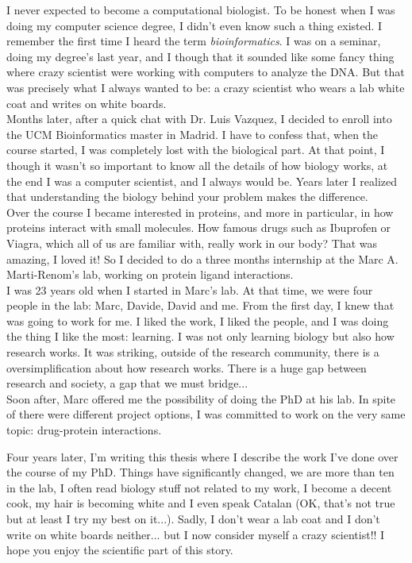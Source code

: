 \documentclass[11pt, b5paper,twoside]{tesi_upf}
\begin{document}
\par I never expected to become a computational biologist. To be honest when I was doing my computer science degree, I didn't even know such a thing existed. I remember the first time I heard the term \textit{bioinformatics}. I was on a seminar, doing my degree's last year, and I though that it sounded like some fancy thing where crazy scientist were working with computers to analyze the DNA. But that was precisely what I always wanted to be: a crazy scientist who wears a lab white coat and writes on white boards.\\ 
Months later, after a quick chat with Dr. Luis Vazquez, I decided to enroll into the UCM Bioinformatics master in Madrid. I have to confess that, when the course started, I was completely lost with the biological part. At that point, I though it wasn't so important to know all the details of how biology works, at the end I was a computer scientist, and I always would be. Years later I realized that understanding the biology behind your problem makes the difference. \\
Over the course I became interested in proteins, and more in particular, in how proteins interact with small molecules. How famous drugs such as Ibuprofen or Viagra, which all of us are familiar with, really work in our body? That was amazing, I loved it! So I decided to do a three months internship at the Marc A. Marti-Renom's lab, working on protein ligand interactions. \\
I was 23 years old when I started in Marc's lab. At that time, we were four people in the lab: Marc, Davide, David and me. From the first day, I knew that was going to work for me. I liked the work, I liked the people, and I was doing the thing I like the most: learning. I was not only learning biology but also how research works. It was striking, outside of the research community, there is a oversimplification about how research works. There is a huge gap between research and society, a gap that we must bridge...  \\
Soon after, Marc offered me the possibility of doing the PhD at his lab. In spite of there were different project options, I was committed to work on the very same topic: drug-protein interactions. 
\par Four years later, I'm writing this thesis where I describe the work I've done over the course of my PhD. Things have significantly changed, we are more than ten in the lab, I often read biology stuff not related to my work, I become a decent cook, my hair is becoming white and I even speak Catalan (OK, that's not true but at least I try my best on it...). Sadly, I don't wear a lab coat and I don't write on white boards neither... but I now consider myself a crazy scientist!! I hope you enjoy the scientific part of this story.  
\end{document}
